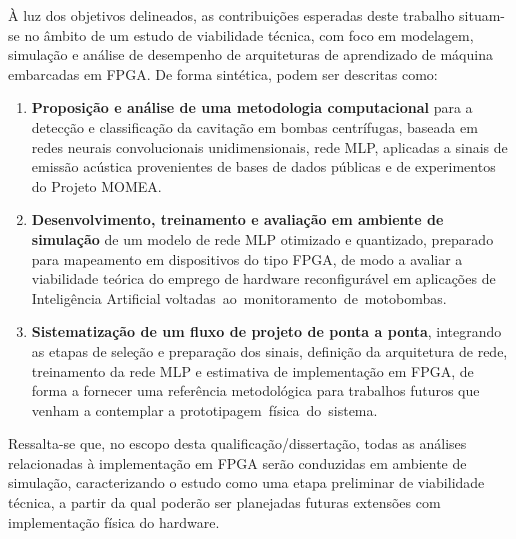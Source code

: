 À luz dos objetivos delineados, as contribuições esperadas deste trabalho situam-se no âmbito de um estudo de viabilidade técnica, com foco em modelagem, simulação e análise de desempenho de arquiteturas de aprendizado de máquina embarcadas em FPGA. De forma sintética, podem ser descritas como:

\begin{enumerate}[label=\textbf{\arabic*.}]
	\item \textbf{Proposição e análise de uma metodologia computacional} para a detecção e classificação da cavitação em bombas centrífugas, baseada em redes neurais convolucionais unidimensionais, rede MLP, aplicadas a sinais de emissão acústica provenientes de bases de dados públicas e de experimentos do Projeto MOMEA.
	
	\item \textbf{Desenvolvimento, treinamento e avaliação em ambiente de simulação} de um modelo de rede MLP otimizado e quantizado, preparado para mapeamento em dispositivos do tipo FPGA, de modo a avaliar a viabilidade teórica do emprego de hardware reconfigurável em aplicações de Inteligência Artificial \mbox{voltadas ao monitoramento de motobombas.}
	
	\item \textbf{Sistematização de um fluxo de projeto de ponta a ponta}, integrando as etapas de seleção e preparação dos sinais, definição da arquitetura de rede, treinamento da rede MLP e estimativa de implementação em FPGA, de forma a fornecer uma referência metodológica para trabalhos futuros que venham a contemplar a \mbox{prototipagem física do sistema.}
\end{enumerate}

Ressalta-se que, no escopo desta qualificação/dissertação, todas as análises relacionadas à implementação em FPGA serão conduzidas em ambiente de simulação, caracterizando o estudo como uma etapa preliminar de viabilidade técnica, a partir da qual poderão ser planejadas futuras extensões com implementação física do hardware.
